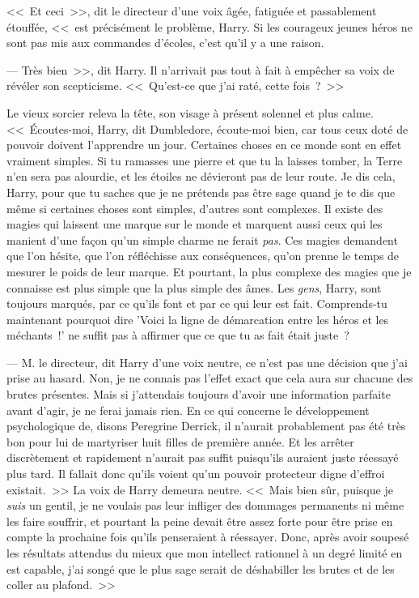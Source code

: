 <<~Et ceci~>>, dit le directeur d'une voix âgée, fatiguée et passablement étouffée, <<~est précisément le problème, Harry. Si les courageux jeunes héros ne sont pas mis aux commandes d'écoles, c'est qu'il y a une raison.

--- Très bien~>>, dit Harry. Il n'arrivait pas tout à fait à empêcher sa voix de révéler son scepticisme. <<~Qu'est-ce que j'ai raté, cette fois~?~>>

Le vieux sorcier releva la tête, son visage à présent solennel et plus calme. <<~Écoutes-moi, Harry, dit Dumbledore, écoute-moi bien, car tous ceux doté de pouvoir doivent l'apprendre un jour. Certaines choses en ce monde sont en effet vraiment simples. Si tu ramasses une pierre et que tu la laisses tomber, la Terre n'en sera pas alourdie, et les étoiles ne dévieront pas de leur route. Je dis cela, Harry, pour que tu saches que je ne prétends pas être sage quand je te dis que même si certaines choses sont simples, d'autres sont complexes. Il existe des magies qui laissent une marque sur le monde et marquent aussi ceux qui les manient d'une façon qu'un simple charme ne ferait \emph{pas}. Ces magies demandent que l'on hésite, que l'on réfléchisse aux conséquences, qu'on prenne le temps de mesurer le poids de leur marque. Et pourtant, la plus complexe des magies que je connaisse est plus simple que la plus simple des âmes. Les \emph{gens}, Harry, sont toujours marqués, par ce qu'ils font et par ce qui leur est fait. Comprends-tu maintenant pourquoi dire 'Voici la ligne de démarcation entre les héros et les méchants~!' ne suffit pas à affirmer que ce que tu as fait était juste~?

--- M. le directeur, dit Harry d'une voix neutre, ce n'est pas une décision que j'ai prise au hasard. Non, je ne connais pas l'effet exact que cela aura sur chacune des brutes présentes. Mais si j'attendais toujours d'avoir une information parfaite avant d'agir, je ne ferai jamais rien. En ce qui concerne le développement psychologique de, disons Peregrine Derrick, il n'aurait probablement pas été très bon pour lui de martyriser huit filles de première année. Et les arrêter discrètement et rapidement n'aurait pas suffit puisqu'ils auraient juste réessayé plus tard. Il fallait donc qu'ils voient qu'un pouvoir protecteur digne d'effroi existait.~>> La voix de Harry demeura neutre. <<~Mais bien sûr, puisque je \emph{suis} un gentil, je ne voulais pas leur infliger des dommages permanents ni même les faire souffrir, et pourtant la peine devait être assez forte pour être prise en compte la prochaine fois qu'ils penseraient à réessayer. Donc, après avoir soupesé les résultats attendus du mieux que mon intellect rationnel à un degré limité en est capable, j'ai songé que le plus sage serait de déshabiller les brutes et de les coller au plafond.~>>

